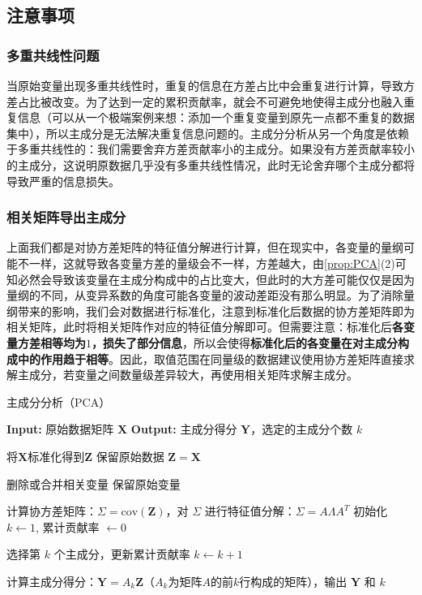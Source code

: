 \subsection{注意事项}
\subsubsection{多重共线性问题}
当原始变量出现多重共线性时，重复的信息在方差占比中会重复进行计算，导致方差占比被改变。为了达到一定的累积贡献率，就会不可避免地使得主成分也融入重复信息（可以从一个极端案例来想：添加一个重复变量到原先一点都不重复的数据集中），所以主成分是无法解决重复信息问题的。主成分分析从另一个角度是依赖于多重共线性的：我们需要舍弃方差贡献率小的主成分。如果没有方差贡献率较小的主成分，这说明原数据几乎没有多重共线性情况，此时无论舍弃哪个主成分都将导致严重的信息损失。
\subsubsection{相关矩阵导出主成分}
上面我们都是对协方差矩阵的特征值分解进行计算，但在现实中，各变量的量纲可能不一样，这就导致各变量方差的量级会不一样，方差越大，由\cref{prop:PCA}(2)可知必然会导致该变量在主成分构成中的占比变大，但此时的大方差可能仅仅是因为量纲的不同，从变异系数的角度可能各变量的波动差距没有那么明显。为了消除量纲带来的影响，我们会对数据进行标准化，注意到标准化后数据的协方差矩阵即为相关矩阵，此时将相关矩阵作对应的特征值分解即可。但需要注意：标准化后\textbf{各变量方差相等均为$1$，损失了部分信息}，所以会使得\textbf{标准化后的各变量在对主成分构成中的作用趋于相等}。因此，取值范围在同量级的数据建议使用协方差矩阵直接求解主成分，若变量之间数量级差异较大，再使用相关矩阵求解主成分。
\begin{algorithm}[H]
	\caption{主成分分析（PCA）}
	\begin{algorithmic}[1]
		\State \textbf{Input:} 原始数据矩阵 $\mathbf{X}$
		\State \textbf{Output:} 主成分得分 $\mathbf{Y}$，选定的主成分个数 $k$
		
		\State 将$\mathbf{X}$标准化得到$\mathbf{Z}$
		\Else
		\State 保留原始数据 $\mathbf{Z} = \mathbf{X}$
		\EndIf
		
		\State 删除或合并相关变量
		\Else
		\State 保留原始变量
		\EndIf
		
		\State 计算协方差矩阵：$\Sigma = \text{cov}(\mathbf{Z})$，对 $\Sigma$ 进行特征值分解：$\Sigma = A \Lambda A^T$
		\State 初始化 $k \gets 1$, 累计贡献率 $\gets 0$
	
		\Repeat
		\State 选择第 $k$ 个主成分，更新累计贡献率
		\State $k \gets k + 1$
		\EndIf
		
		\State 计算主成分得分：$\mathbf{Y}=A_k\mathbf{Z}$（$A_k$为矩阵$A$的前$k$行构成的矩阵），输出 $\mathbf{Y}$ 和 $k$
	\end{algorithmic}
\end{algorithm}

